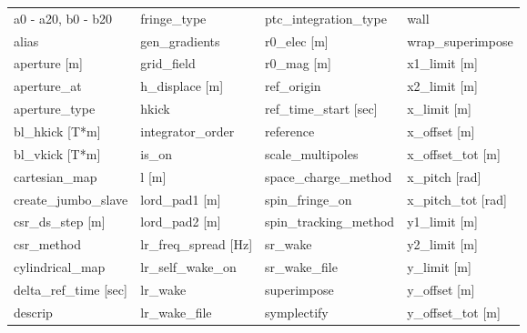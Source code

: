  \begin{tabular}{llll} \toprule
a0 - a20, b0 - b20               & fringe_type                      & ptc_integration_type             & wall                             \\
alias                            & gen_gradients                    & r0_elec [m]                      & wrap_superimpose                 \\
aperture [m]                     & grid_field                       & r0_mag [m]                       & x1_limit [m]                     \\
aperture_at                      & h_displace [m]                   & ref_origin                       & x2_limit [m]                     \\
aperture_type                    & hkick                            & ref_time_start [sec]             & x_limit [m]                      \\
bl_hkick [T*m]                   & integrator_order                 & reference                        & x_offset [m]                     \\
bl_vkick [T*m]                   & is_on                            & scale_multipoles                 & x_offset_tot [m]                 \\
cartesian_map                    & l [m]                            & space_charge_method              & x_pitch [rad]                    \\
create_jumbo_slave               & lord_pad1 [m]                    & spin_fringe_on                   & x_pitch_tot [rad]                \\
csr_ds_step [m]                  & lord_pad2 [m]                    & spin_tracking_method             & y1_limit [m]                     \\
csr_method                       & lr_freq_spread [Hz]              & sr_wake                          & y2_limit [m]                     \\
cylindrical_map                  & lr_self_wake_on                  & sr_wake_file                     & y_limit [m]                      \\
delta_ref_time [sec]             & lr_wake                          & superimpose                      & y_offset [m]                     \\
descrip                          & lr_wake_file                     & symplectify                      & y_offset_tot [m]                 \\

\end{tabular}
